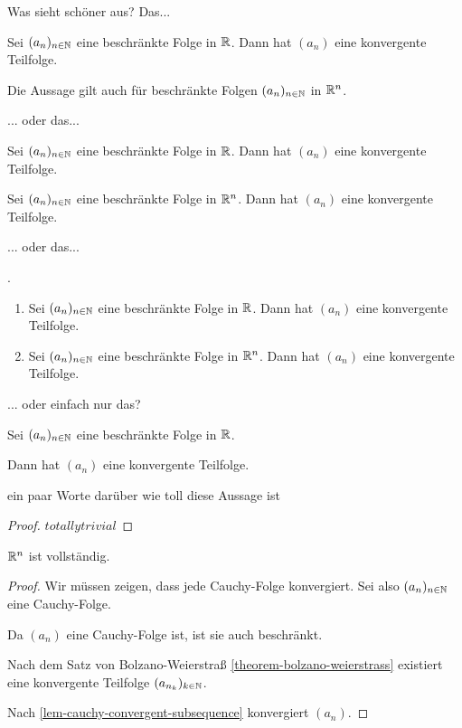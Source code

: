 \begin{query}
    Was sieht schöner aus? Das...
\end{query}
\begin{theorem}
    Sei $(a_n)_{n \in \mathbb{N}}$ eine beschränkte Folge in $\mathbb{R}$. Dann hat $(a_n)$ eine konvergente Teilfolge.

    Die Aussage gilt auch für  beschränkte Folgen $(a_n)_{n \in \mathbb{N}}$ in $\mathbb{R}^n$.
\end{theorem}
... oder das...
\begin{theorem}
    Sei $(a_n)_{n \in \mathbb{N}}$ eine beschränkte Folge in $\mathbb{R}$. Dann hat $(a_n)$ eine konvergente Teilfolge.

    Sei $(a_n)_{n \in \mathbb{N}}$ eine beschränkte Folge in $\mathbb{R}^n$. Dann hat $(a_n)$ eine konvergente Teilfolge.
\end{theorem}
... oder das...
\begin{theorem}
    .
    \begin{enumerate}
        \item Sei $(a_n)_{n \in \mathbb{N}}$ eine beschränkte Folge in $\mathbb{R}$. Dann hat $(a_n)$ eine konvergente Teilfolge.
        \item Sei $(a_n)_{n \in \mathbb{N}}$ eine beschränkte Folge in $\mathbb{R}^n$. Dann hat $(a_n)$ eine konvergente Teilfolge.
    \end{enumerate}
\end{theorem}
... oder einfach nur das?
\begin{theorem}
    Sei $(a_n)_{n \in \mathbb{N}}$ eine beschränkte Folge in $\mathbb{R}$.
    
    Dann hat $(a_n)$ eine konvergente Teilfolge.
\end{theorem}

ein paar Worte darüber wie toll diese Aussage ist

\begin{proof}
    $totallytrivial$
\end{proof}

\begin{corollary}
    \label{cor-r-hoch-n-ist-vollständig}
    $\mathbb{R}^n$ ist vollständig.
\end{corollary}
\begin{proof}
    Wir müssen zeigen, dass jede Cauchy-Folge konvergiert. Sei also $(a_n)_{n \in \mathbb{N}}$ eine Cauchy-Folge.

    Da $(a_n)$ eine Cauchy-Folge ist, ist sie auch beschränkt.
    
    Nach dem Satz von Bolzano-Weierstraß \ref{theorem-bolzano-weierstrass} existiert eine konvergente Teilfolge $(a_{n_k})_{k \in \mathbb{N}}$.

    Nach \ref{lem-cauchy-convergent-subsequence} konvergiert $(a_n)$.
\end{proof}

